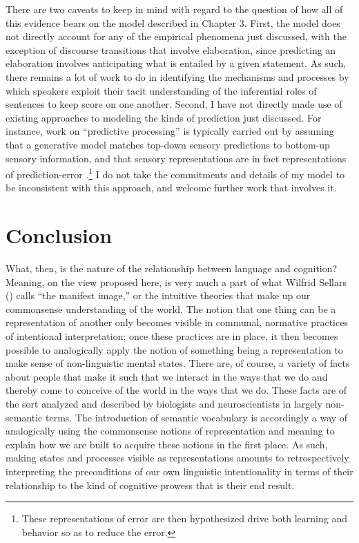 There are two caveats to keep in mind with regard to the question of how all of this evidence bears on the model described in Chapter 3. First, the model does not directly account for any of the empirical phenomena just discussed, with the exception of discourse transitions that involve elaboration, since predicting an elaboration involves anticipating what is entailed by a given statement. As such, there remains a lot of work to do in identifying the mechanisms and processes by which speakers exploit their tacit understanding of the inferential roles of sentences to keep score on one another. Second, I have not directly made use of existing approaches to modeling the kinds of prediction just discussed. For instance, work on ``predictive processing'' is typically carried out by assuming that a generative model matches top-down sensory predictions to bottom-up sensory information, and that sensory representations are in fact representations of prediction-error \citep{clark:2013}.\footnote{These representations of error are then hypothesized drive both learning and behavior so as to reduce the error.} I do not take the commitments and details of my model to be inconsistent with this approach, and welcome further work that involves it.

\section{Conclusion}

What, then, is the nature of the relationship between language and cognition? Meaning, on the view proposed here, is very much a part of what Wilfrid Sellars (\citeyear{Sellars:1963}) calls ``the manifest image,'' or the intuitive theories that make up our commonsense understanding of the world. The notion that one thing can be a representation of another only becomes visible in communal, normative practices of intentional interpretation; once these practices are in place, it then becomes possible to analogically apply the notion of something being a representation to make sense of non-linguistic mental states. There are, of course, a variety of facts about people that make it such that we interact in the ways that we do and thereby come to conceive of the world in the ways that we do. These facts are of the sort analyzed and described by biologists and neuroscientists in largely non-semantic terms. The introduction of semantic vocabulary is accordingly a way of analogically using the commonsense notions of representation and meaning to explain how we are built to acquire these notions in the first place. As such, making states and processes visible as representations amounts to retrospectively interpreting the preconditions of our own linguistic intentionality in terms of their relationship to the kind of cognitive prowess that is their end result.